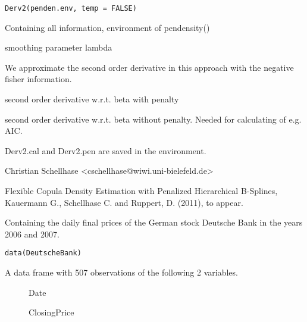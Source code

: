 \documentclass[a4paper]{book}
\begin{document}
%
\begin{Usage}
\begin{verbatim}
Derv2(penden.env, temp = FALSE)
\end{verbatim}
\end{Usage}
%
\begin{Arguments}
\begin{ldescription}
\item[\code{penden.env}] Containing all information, environment of pendensity()
\item[\code{temp}] smoothing parameter lambda
\end{ldescription}
\end{Arguments}
%
\begin{Details}\relax
We approximate the second order derivative in this approach with the negative fisher information. 
\end{Details}
%
\begin{Value}
\begin{ldescription}
\item[\code{Derv2.pen}] second order derivative w.r.t. beta with penalty
\item[\code{Derv2.cal}] second order derivative w.r.t. beta without
penalty. Needed for calculating of e.g. AIC.
\end{ldescription}
Derv2.cal and Derv2.pen are saved in the environment.
\end{Value}
%
\begin{Author}\relax
Christian Schellhase <cschellhase@wiwi.uni-bielefeld.de>
\end{Author}
%
\begin{References}\relax
Flexible Copula Density Estimation with Penalized
Hierarchical B-Splines, Kauermann G., Schellhase C. and Ruppert, D. (2011), to appear.
\end{References}
%
\begin{Description}\relax
Containing the daily final prices of the German stock Deutsche Bank in the years 2006 and 2007.
\end{Description}
%
\begin{Usage}
\begin{verbatim}
data(DeutscheBank)
\end{verbatim}
\end{Usage}
%
\begin{Format}
A data frame with 507 observations of the following 2 variables.
\begin{description}

\item[] Date
\item[] ClosingPrice

\end{description}

\end{Format}
\end{document}
